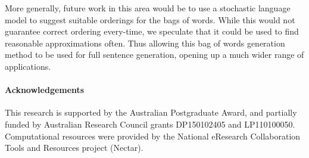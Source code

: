 \documentclass{llncs}
\begin{document}
More generally, future work in this area would be to use a stochastic language model to suggest suitable orderings for the bags of words. While this would not guarantee correct ordering every-time, we speculate that it could be used to find reasonable approximations often. Thus allowing this bag of words generation method to be used for full sentence generation, opening up a much wider range of applications.

\paragraph{Acknowledgements}
This research is supported by the Australian Postgraduate
Award, and partially funded by Australian Research Council grants
DP150102405 and LP110100050. Computational resources were provided by the National eResearch Collaboration Tools and Resources project (Nectar).

\printbibliography
\end{document}
